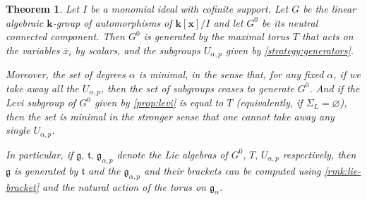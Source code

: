 \documentclass[11pt,letterpaper,reqno]{amsart}
\newtheorem{theorem}{Theorem}[section]
\theoremstyle{remark}
\theoremstyle{definition}
\def\XX{\mathbf{x}}
\newcommand{\KK}[0]{\ensuremath{\mathbf{k}}}
\begin{document}
\begin{theorem}\label{thm:minimal-generators}
Let $I$ be a monomial ideal with cofinite support. Let $G$ be the linear algebraic $\KK$-group of automorphisms of $\KK[\XX]/I$ and let $G^0$ be its neutral connected component. Then $G^0$ is generated by the maximal torus $T$ that acts on the variables $\overline x_i$ by scalars, and the subgroups $U_{\alpha,p}$ given by \cref{strategy:generators}.

Moreover, the set of degrees $\alpha$ is minimal, in the sense that, for any fixed $\alpha$, if we take away all the $U_{\alpha,p}$, then the set of subgroups ceases to generate $G^0$. And if the Levi subgroup of $G^0$ given by \cref{prop:levi} is equal to $T$ (equivalently, if $\Sigma_L=\varnothing$), then the set is minimal in the stronger sense that one cannot take away any single $U_{\alpha,p}$.

In particular, if $\mathfrak g,\,\mathfrak t,\,\mathfrak g_{\alpha,p}$ denote the Lie algebras of $G^0,\,T,\, U_{\alpha,p}$ respectively, then $\mathfrak g$ is generated by $\mathfrak t$ and the $\mathfrak g_{\alpha,p}$ and their brackets can be computed using \cref{rmk:lie-bracket} and the natural action of the torus on $\mathfrak g_\alpha$.
\end{theorem}
\end{document}
